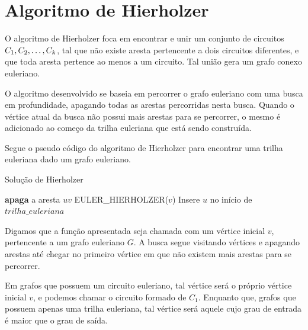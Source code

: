 

\section{Algoritmo de Hierholzer}

\label{alg-hierholzer}

O algoritmo de Hierholzer foca em encontrar e unir um conjunto de circuitos $C_1, C_2,\- \dots, C_k$, tal que não existe aresta pertencente a dois circuitos diferentes, e que toda aresta pertence ao menos a um circuito.
Tal união gera um grafo conexo euleriano.

O algoritmo desenvolvido se baseia em percorrer o grafo euleriano com uma busca em profundidade, apagando todas as arestas percorridas nesta busca.
Quando o vértice atual da busca não possui mais arestas para se percorrer, o mesmo é adicionado ao começo da trilha euleriana que está sendo construída.

Segue o pseudo código do algoritmo de Hierholzer para encontrar uma trilha euleriana dado um grafo euleriano.

\begin{algorithm}
    \caption{Solução de Hierholzer}\label{eulerian-hierholzer}
    \begin{algorithmic}[1]
        \State \textbf{apaga} a aresta $uv$
        \State EULER\_HIERHOLZER($v$)
    \EndFor
    \State Insere $u$ no início de $trilha\_euleriana$
    \EndFunction
    \end{algorithmic}
\end{algorithm}

Digamos que a função apresentada seja chamada com um vértice inicial $v$, pertencente a um grafo euleriano $G$. A busca segue visitando vértices e apagando arestas até chegar no primeiro vértice em que não existem mais arestas para se percorrer. 

Em grafos que possuem um circuito euleriano, tal vértice será o próprio vértice inicial $v$, e podemos chamar o circuito formado de $C_1$.
Enquanto que, grafos que possuem apenas uma trilha euleriana, tal vértice será aquele cujo grau de entrada é maior que o grau de saída.

